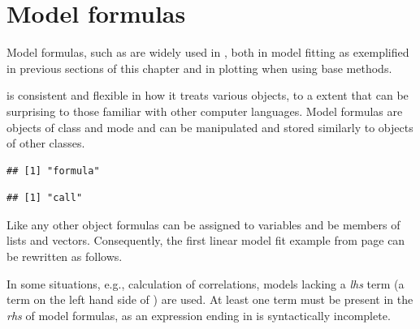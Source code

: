\documentclass[krantz2]{krantz}\usepackage{knitr}
\begin{document}
\section{Model formulas}\label{sec:stat:formulas}
Model formulas, such as  are widely used in \Rlang, both in model fitting as exemplified in previous sections of this chapter and in plotting when using base \Rlang {} methods.

\Rlang is consistent and flexible in how it treats various objects, to a extent that can be surprising to those familiar with other computer languages. Model formulas are objects of class  and mode  and can be manipulated and stored similarly to objects of other classes.

\begin{knitrout}\footnotesize
{}\color{fgcolor}\begin{kframe}
\begin{alltt}
 \hlopt{~} 
\end{alltt}
\begin{verbatim}
## [1] "formula"
\end{verbatim}
\begin{alltt}
 \hlopt{~} 
\end{alltt}
\begin{verbatim}
## [1] "call"
\end{verbatim}
\end{kframe}
\end{knitrout}

Like any other \Rlang object formulas can be assigned to variables and be members of lists and vectors. Consequently, the first linear model fit example from page \pageref{chunk:lm:models1} can be rewritten as follows.

\begin{knitrout}\footnotesize
{}\color{fgcolor}\begin{kframe}
\begin{alltt}
 \hlkwb{<-}  \hlopt{~}  \hlopt{+} 
 \hlkwb{<-}  
\end{alltt}
\end{kframe}
\end{knitrout}

In some situations, e.g., calculation of correlations, models lacking a \emph{lhs} term (a term on the left hand side of ) are used. At least one term must be present in the \emph{rhs} of model formulas, as an expression ending in  is syntactically incomplete.
\end{document}
